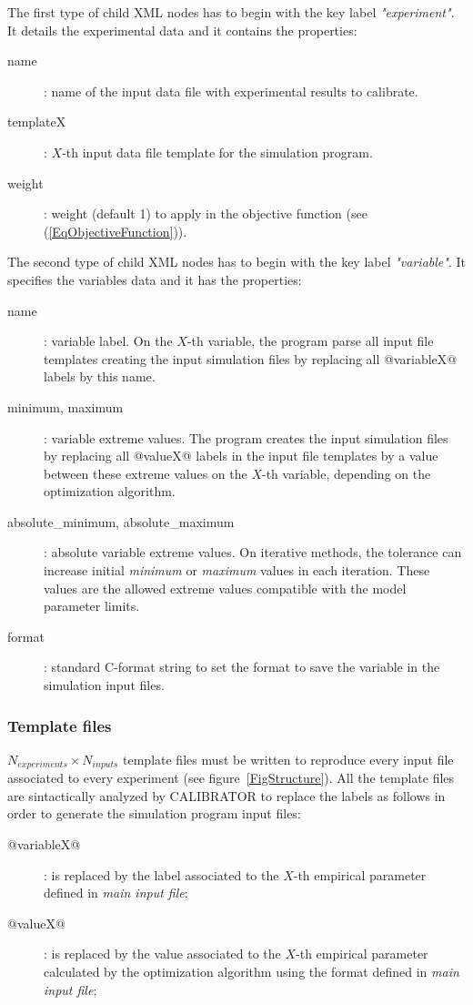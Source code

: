 \documentclass[review,authoryear]{elsarticle}
\begin{document}
The first type of child XML nodes has to begin with the key label
\emph{"experiment"}. It details the experimental data and it contains the properties:
\begin{description}
	\item[name]: name of the input data file with experimental results to calibrate.
	\item[templateX]: $X$-th input data file template for the simulation program.
	\item[weight]: weight (default 1) to apply in the objective function (see (\ref{EqObjectiveFunction})).
\end{description}

The second type of child XML nodes has to begin with the key label
\emph{"variable"}. It specifies the variables data and it has the properties:
\begin{description}
	\item[name]: variable label. On the $X$-th variable, the program parse all input
file templates creating the input simulation files by replacing all
@variableX@ labels by this name.
\item[minimum, maximum]: variable extreme values. The program creates the input
simulation files by replacing all @valueX@ labels in the input file templates
by a value between these extreme values on the $X$-th variable, depending on the
optimization algorithm.
\item[absolute\_minimum, absolute\_maximum]: absolute variable extreme values.
On iterative methods, the tolerance can increase initial \emph{minimum} or
\emph{maximum} values in each iteration. These values are the allowed extreme values
compatible with the model parameter limits.
\item[format]: standard C-format string to set the format to save the variable
in the simulation input files.
\end{description}

\subsubsection{Template files}

$N_{experiments}\times N_{inputs}$
template files must be written to reproduce every input file associated to every experiment (see figure~\ref{FigStructure}). All the template files are sintactically analyzed by CALIBRATOR to replace the labels as follows in order to generate the simulation program input files:
\begin{description}
\item[@variableX@]: is replaced by the label associated to the $X$-th empirical parameter defined in \emph{main input file};
\item[@valueX@]: is replaced by the value associated to the $X$-th empirical parameter calculated by the optimization algorithm using the format defined in \emph{main input file};
\end{description}
\end{document}
